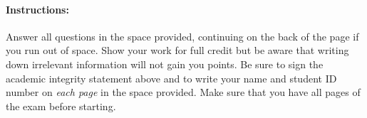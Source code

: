 \documentclass[addpoints,12pt]{exam}
\begin{document}
\begin{center}
\large
{} %

\vspace{1em}
\vspace{0.2in}
\normalsize
{}


\end{center}



\vspace{2em}
\begin{center}
\end{center}
\vspace{0.2in}

\vspace{0.2in}

\noindent{}

\vspace{0.2in}

\noindent{}
\hfill
{}



\vspace{2em}

\paragraph{Instructions:} Answer all questions in the space provided, continuing on the back of the page if you run out of space. Show your work for full credit but be aware that writing down irrelevant information will not gain you points. Be sure to sign the academic integrity statement above and to write your name and student ID number on \emph{each page} in the space provided. Make sure that you have all pages of the exam before starting.
\end{document}
